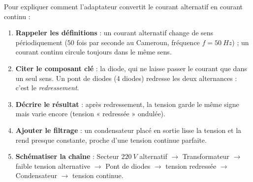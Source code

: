\documentclass[11pt]{article}
\newcommand{\cle}[1]{{\popxbold\color{popdark}#1}}
\begin{document}
\begin{methode}
Pour expliquer comment l'adaptateur convertit le courant alternatif en courant continu :
\begin{enumerate}
\item \textbf{Rappeler les définitions} : un courant \cle{alternatif} change de sens périodiquement ($\num{50}$ fois par seconde au Cameroun, fréquence $f = \SI{50}{Hz}$) ; un courant \cle{continu} circule toujours dans le même sens.
\item \textbf{Citer le composant clé} : la \cle{diode}, qui ne laisse passer le courant que dans un seul sens. Un \cle{pont de diodes} (4 diodes) redresse les deux alternances : c'est le \emph{redressement}.
\item \textbf{Décrire le résultat} : après redressement, la tension garde le même signe mais varie encore (tension « redressée » ondulée).
\item \textbf{Ajouter le filtrage} : un \cle{condensateur} placé en sortie lisse la tension et la rend presque constante, proche d'une tension continue parfaite.
\item \textbf{Schématiser la chaîne} : Secteur $\SI{220}{V}$ alternatif $\rightarrow$ Transformateur $\rightarrow$ faible tension alternative $\rightarrow$ Pont de diodes $\rightarrow$ tension redressée $\rightarrow$ Condensateur $\rightarrow$ tension continue.
\end{enumerate}
\end{methode}
\end{document}
